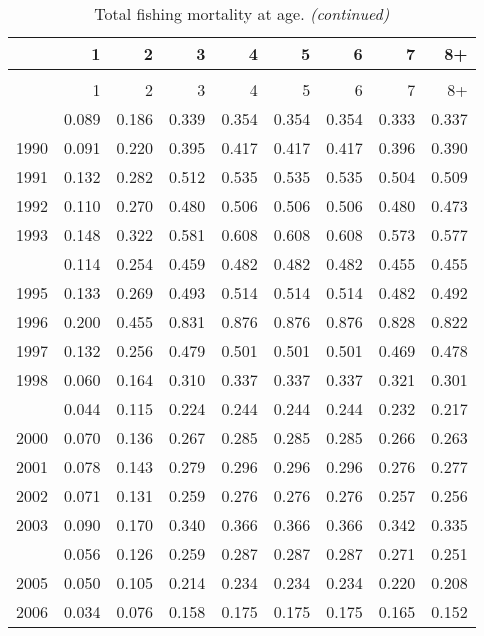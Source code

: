 \documentclass[
]{article}
\begin{document}
\begin{longtable}[t]{lrrrrrrrr}
\caption{\label{tab:FAA-tot-table}Total fishing mortality at age.}\\
\toprule
  & 1 & 2 & 3 & 4 & 5 & 6 & 7 & 8+\\
\midrule
\endfirsthead
\caption[]{Total fishing mortality at age. \textit{(continued)}}\\
\toprule
  & 1 & 2 & 3 & 4 & 5 & 6 & 7 & 8+\\
\midrule
\endhead

\endfoot
\bottomrule
\endlastfoot
1989 & 0.089 & 0.186 & 0.339 & 0.354 & 0.354 & 0.354 & 0.333 & 0.337\\
1990 & 0.091 & 0.220 & 0.395 & 0.417 & 0.417 & 0.417 & 0.396 & 0.390\\
1991 & 0.132 & 0.282 & 0.512 & 0.535 & 0.535 & 0.535 & 0.504 & 0.509\\
1992 & 0.110 & 0.270 & 0.480 & 0.506 & 0.506 & 0.506 & 0.480 & 0.473\\
1993 & 0.148 & 0.322 & 0.581 & 0.608 & 0.608 & 0.608 & 0.573 & 0.577\\
\addlinespace
1994 & 0.114 & 0.254 & 0.459 & 0.482 & 0.482 & 0.482 & 0.455 & 0.455\\
1995 & 0.133 & 0.269 & 0.493 & 0.514 & 0.514 & 0.514 & 0.482 & 0.492\\
1996 & 0.200 & 0.455 & 0.831 & 0.876 & 0.876 & 0.876 & 0.828 & 0.822\\
1997 & 0.132 & 0.256 & 0.479 & 0.501 & 0.501 & 0.501 & 0.469 & 0.478\\
1998 & 0.060 & 0.164 & 0.310 & 0.337 & 0.337 & 0.337 & 0.321 & 0.301\\
\addlinespace
1999 & 0.044 & 0.115 & 0.224 & 0.244 & 0.244 & 0.244 & 0.232 & 0.217\\
2000 & 0.070 & 0.136 & 0.267 & 0.285 & 0.285 & 0.285 & 0.266 & 0.263\\
2001 & 0.078 & 0.143 & 0.279 & 0.296 & 0.296 & 0.296 & 0.276 & 0.277\\
2002 & 0.071 & 0.131 & 0.259 & 0.276 & 0.276 & 0.276 & 0.257 & 0.256\\
2003 & 0.090 & 0.170 & 0.340 & 0.366 & 0.366 & 0.366 & 0.342 & 0.335\\
\addlinespace
2004 & 0.056 & 0.126 & 0.259 & 0.287 & 0.287 & 0.287 & 0.271 & 0.251\\
2005 & 0.050 & 0.105 & 0.214 & 0.234 & 0.234 & 0.234 & 0.220 & 0.208\\
2006 & 0.034 & 0.076 & 0.158 & 0.175 & 0.175 & 0.175 & 0.165 & 0.152\\

\end{longtable}
\end{document}
